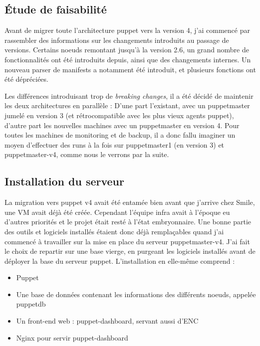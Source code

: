 \documentclass[14 pt]{extreport}
\begin{document}
\subsection{Étude de faisabilité}

Avant de migrer toute l'architecture puppet vers la version 4, j'ai commencé par rassembler des informations sur les changements introduits au passage de versions. Certains noeuds remontant jusqu'à la version 2.6, un grand nombre de fonctionnalités ont été introduits depuis, ainsi que des changements internes. Un nouveau parser de manifests a notamment été introduit, et plusieurs fonctions ont été dépréciées.

Les différences introduisant trop de \emph{breaking changes}, il a été décidé de maintenir les deux architectures en parallèle : D'une part l'existant, avec un puppetmaster jumelé en version 3 (et rétrocompatible avec les plus vieux agents puppet), d'autre part les nouvelles machines avec un puppetmaster en version 4. Pour toutes les machines de monitoring et de backup, il a donc fallu imaginer un moyen d'effectuer des runs à la fois sur puppetmaster1 (en version 3) et puppetmaster-v4, comme nous le verrons par la suite.

\subsection{Installation du serveur}

La migration vers puppet v4 avait été entamée bien avant que j'arrive chez Smile, une VM avait déjà été créée. Cependant l'équipe infra avait à l'époque eu d'autres priorités et le projet était resté à l'état embryonnaire. Une bonne partie des outils et logiciels installés étaient donc déjà remplaçables quand j'ai commencé à travailler sur la mise en place du serveur puppetmaster-v4. J'ai fait le choix de repartir sur une base vierge, en purgeant les logiciels installés avant de déployer la base du serveur puppet. L'installation en elle-même comprend :

\begin{itemize}
	\item Puppet
	\item Une base de données contenant les informations des différents noeuds, appelée puppetdb
	\item Un front-end web : puppet-dashboard, servant aussi d'ENC
	\item Nginx pour servir puppet-dashboard
\end{itemize}
\end{document}
